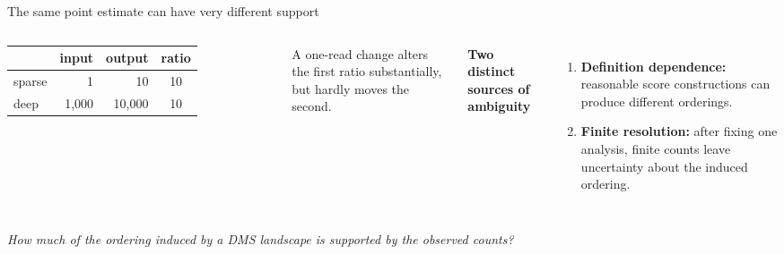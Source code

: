 \documentclass[aspectratio=169,11pt]{beamer}
\newcommand{\key}[1]{\textcolor{boxrule}{\bfseries #1}}
\begin{document}
\begin{frame}{The same point estimate can have very different support}
  \begin{columns}[T,onlytextwidth]
      \centering
      \vspace{0.2cm}
      \begin{tabular}{lrrc}
        \toprule
        & input & output & ratio \\
        \midrule
        sparse & 1 & 10 & 10 \\
        deep & 1,000 & 10,000 & 10 \\
        \bottomrule
      \end{tabular}

      \vspace{0.45cm}
      {\small A one-read change alters the first ratio substantially, but hardly moves the second.}

      \key{Two distinct sources of ambiguity}
      \begin{enumerate}
        \item \textbf{Definition dependence:} reasonable score constructions can produce different orderings.
        \item \textbf{Finite resolution:} after fixing one analysis, finite counts leave uncertainty about the induced ordering.
      \end{enumerate}
  \end{columns}

  \vspace{0.15cm}
  \begin{callout}
    \centering
    \large\itshape How much of the ordering induced by a DMS landscape is supported by the observed counts?
  \end{callout}
\end{frame}
\end{document}
